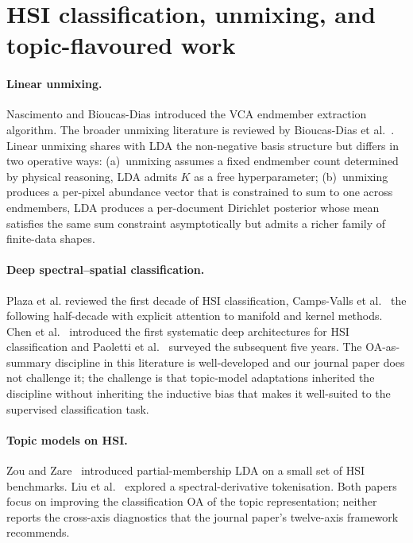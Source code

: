 \documentclass[11pt,a4paper]{article}
\begin{document}
\section{HSI classification, unmixing, and topic-flavoured work}

\paragraph{Linear unmixing.} Nascimento and Bioucas-Dias
\cite{nascimento2005vca} introduced the VCA endmember extraction
algorithm. The broader unmixing literature is reviewed by
Bioucas-Dias et al.~\cite{bioucasdias2012unmixing}. Linear unmixing
shares with LDA the non-negative basis structure but differs in two
operative ways: (a)~unmixing assumes a fixed endmember count
determined by physical reasoning, LDA admits $K$ as a free
hyperparameter; (b)~unmixing produces a per-pixel abundance vector
that is constrained to sum to one across endmembers, LDA produces a
per-document Dirichlet posterior whose mean satisfies the same sum
constraint asymptotically but admits a richer family of finite-data
shapes.

\paragraph{Deep spectral--spatial classification.} Plaza et al.
\cite{plaza2009recent} reviewed the first decade of HSI
classification, Camps-Valls et al.~\cite{camps2014advances} the
following half-decade with explicit attention to manifold and
kernel methods. Chen et al.~\cite{chen2014deep} introduced the
first systematic deep architectures for HSI classification and
Paoletti et al.~\cite{paoletti2019deep} surveyed the
subsequent five years. The OA-as-summary discipline in this
literature is well-developed and our journal paper does not
challenge it; the challenge is that topic-model adaptations
inherited the discipline without inheriting the inductive bias that
makes it well-suited to the supervised classification task.

\paragraph{Topic models on HSI.} Zou and Zare~\cite{zou2017pmlda}
introduced partial-membership LDA on a small set of HSI benchmarks.
Liu et al.~\cite{liu2019hsilda} explored a spectral-derivative
tokenisation. Both papers focus on improving the classification OA
of the topic representation; neither reports the cross-axis
diagnostics that the journal paper's twelve-axis framework
recommends.
\end{document}
